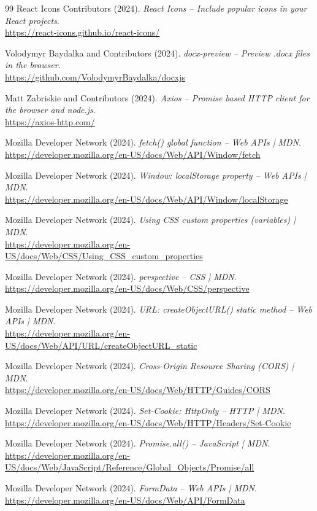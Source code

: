 \begin{thebibliography}{99}
React Icons Contributors (2024).
\textit{React Icons -- Include popular icons in your React projects}.\\
\url{https://react-icons.github.io/react-icons/}

Volodymyr Baydalka and Contributors (2024).
\textit{docx-preview -- Preview .docx files in the browser}.\\
\url{https://github.com/VolodymyrBaydalka/docxjs}

Matt Zabriskie and Contributors (2024).
\textit{Axios -- Promise based HTTP client for the browser and node.js}.\\
\url{https://axios-http.com/}

Mozilla Developer Network (2024).
\textit{fetch() global function -- Web APIs | MDN}.\\
\url{https://developer.mozilla.org/en-US/docs/Web/API/Window/fetch}

Mozilla Developer Network (2024).
\textit{Window: localStorage property -- Web APIs | MDN}.\\
\url{https://developer.mozilla.org/en-US/docs/Web/API/Window/localStorage}

Mozilla Developer Network (2024).
\textit{Using CSS custom properties (variables) | MDN}.\\
\url{https://developer.mozilla.org/en-US/docs/Web/CSS/Using_CSS_custom_properties}

Mozilla Developer Network (2024).
\textit{perspective -- CSS | MDN}.\\
\url{https://developer.mozilla.org/en-US/docs/Web/CSS/perspective}

Mozilla Developer Network (2024).
\textit{URL: createObjectURL() static method -- Web APIs | MDN}.\\
\url{https://developer.mozilla.org/en-US/docs/Web/API/URL/createObjectURL_static}

Mozilla Developer Network (2024).
\textit{Cross-Origin Resource Sharing (CORS) | MDN}.\\
\url{https://developer.mozilla.org/en-US/docs/Web/HTTP/Guides/CORS}

Mozilla Developer Network (2024).
\textit{Set-Cookie: HttpOnly -- HTTP | MDN}.\\
\url{https://developer.mozilla.org/en-US/docs/Web/HTTP/Headers/Set-Cookie}

Mozilla Developer Network (2024).
\textit{Promise.all() -- JavaScript | MDN}.\\
\url{https://developer.mozilla.org/en-US/docs/Web/JavaScript/Reference/Global_Objects/Promise/all}

Mozilla Developer Network (2024).
\textit{FormData -- Web APIs | MDN}.\\
\url{https://developer.mozilla.org/en-US/docs/Web/API/FormData}

\end{thebibliography}
